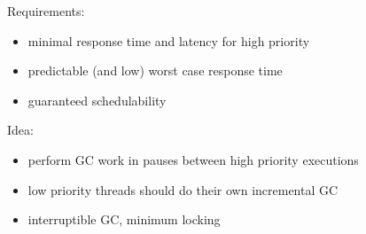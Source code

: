 \documentclass[]{article}
\theoremstyle{definition}
\begin{document}
	Requirements:
	\begin{itemize}
		\item minimal response time and latency for high priority
		\item predictable (and low) worst case response time
		\item guaranteed schedulability
	\end{itemize}

	Idea:
	\begin{itemize}
		\item perform GC work in pauses between high priority executions
		\item low priority threads should do their own incremental GC
		\item interruptible GC, minimum locking
	\end{itemize}
\end{document}
